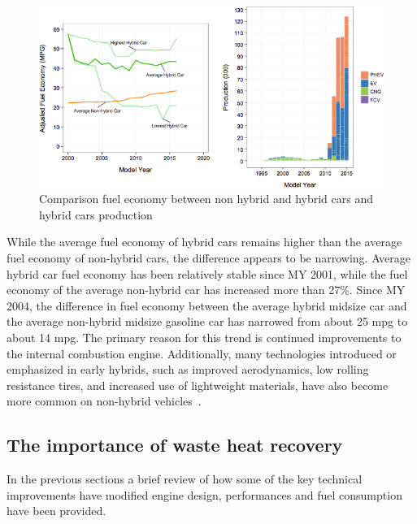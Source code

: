 \begin{figure}[ht]
  \centering
  \includegraphics[width=\textwidth]{figures/review/hybrid.png}
  \caption{Comparison fuel economy between non hybrid and hybrid cars and hybrid cars production \label{fig:hybrids} }
\end{figure}


While the average fuel economy of hybrid cars remains higher than the average fuel economy  of non-hybrid cars, the difference appears to be narrowing. Average hybrid car fuel economy  has been relatively stable since MY 2001, while the fuel economy of the average non-hybrid car has increased more than 27\%. Since MY 2004, the difference in fuel economy between the average hybrid midsize car and the average non-hybrid midsize gasoline car has narrowed from about 25 mpg to about 14 mpg. The primary reason for this trend is continued improvements to the internal combustion engine. Additionally, many technologies introduced or emphasized in early hybrids, such as improved aerodynamics, low rolling resistance tires, and increased use of lightweight materials, have also become more common on non-hybrid vehicles~\cite{EPA2016}.

\subsection{The importance of waste heat recovery}

In the previous sections a brief review of how some of the key technical improvements have modified engine design, performances and fuel consumption have been provided.

